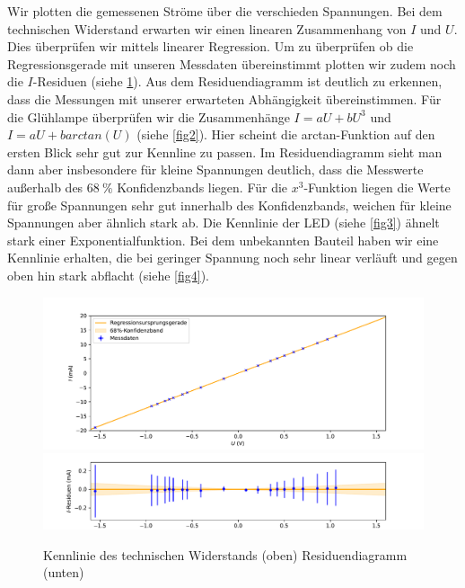 \documentclass[parskip, 12pt, DIV=16, openany]{scrartcl}
\begin{document}
Wir plotten die gemessenen Ströme über die verschieden Spannungen. Bei dem technischen Widerstand erwarten wir einen linearen Zusammenhang von $I$ und $U$. Dies überprüfen wir mittels linearer Regression. Um zu überprüfen ob die Regressionsgerade mit unseren Messdaten übereinstimmt plotten wir zudem noch die $I$-Residuen (siehe \cref{fig1}). Aus dem Residuendiagramm ist deutlich zu erkennen, dass die Messungen mit unserer erwarteten Abhängigkeit übereinstimmen.
Für die Glühlampe überprüfen wir die Zusammenhänge $I = aU + bU^3$ und $I = aU + b arctan(U)$ (siehe \cref{fig2}). Hier scheint die arctan-Funktion auf den ersten Blick sehr gut zur Kennline zu passen. Im Residuendiagramm sieht man dann aber insbesondere für kleine Spannungen deutlich, dass die Messwerte außerhalb des $\SI{68}{\percent}$ Konfidenzbands liegen. Für die $x^3$-Funktion liegen die Werte für große Spannungen sehr gut innerhalb des Konfidenzbands, weichen für kleine Spannungen aber ähnlich stark ab.
Die Kennlinie der LED (siehe \cref{fig3}) ähnelt stark einer Exponentialfunktion.
Bei dem unbekannten Bauteil haben wir eine Kennlinie erhalten, die bei geringer Spannung noch sehr linear verläuft und gegen oben hin stark abflacht (siehe \cref{fig4}).


\begin{figure}
\includegraphics[width=\linewidth]{plot1}%
\vspace*{-1.28cm}\\ %
\includegraphics[width=\linewidth]{plot1residuen}
\caption{Kennlinie des technischen Widerstands (oben) Residuendiagramm (unten)}\label{fig1}
\end{figure}
\end{document}
